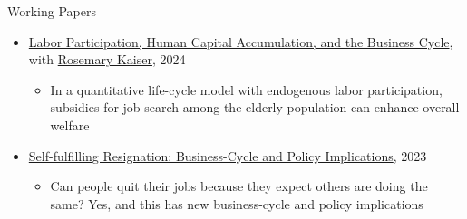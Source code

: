 \documentclass{resume} %
\begin{document}
\begin{rSection}{Working Papers}
\begin{itemize}
		\item[--] \href{https://zhifeng-cai.github.io/papers/lfp_paper__55__.pdf}{Labor Participation, Human Capital Accumulation, and the Business Cycle}, with \href{https://www.rosemarykaiser.com/}{Rosemary Kaiser}, 2024
		\begin{itemize}
			\item In a quantitative life-cycle model with endogenous labor participation, subsidies for job search among the elderly population can enhance overall welfare
		\end{itemize}

		\item[--] \href{https://zhifeng-cai.github.io/papers/draft0331.pdf}{Self-fulfilling Resignation: Business-Cycle and Policy Implications}, 2023
		\begin{itemize}
			\item Can people quit their jobs because they expect others are doing the same? Yes, and this has new business-cycle and policy implications
		\end{itemize}

	\end{itemize}
\end{rSection}
\end{document}
